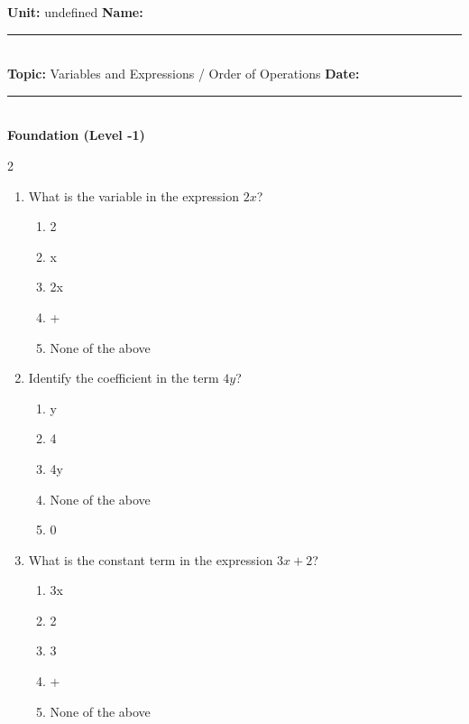 \documentclass[10pt]{article}
\begin{document}
\enlargethispage{2.5cm}

\begin{tcolorbox}[colback=mainblue!5, colframe=mainblue, sharp corners, boxrule=0.5pt]
    \small \textbf{Unit:} undefined \hfill \textbf{Name:} \rule{3cm}{0.4pt} \\
    \small \textbf{Topic:} Variables and Expressions / Order of Operations \hfill \textbf{Date:} \rule{2cm}{0.4pt} \\
    \centering \textbf{\large Foundation (Level -1)}
\end{tcolorbox}

\vspace{0.2cm}

\begin{multicols}{2}
\begin{enumerate}[label=\textbf{Q\arabic*.}, leftmargin=*, itemsep=6pt, parsep=0pt]

  \item \small What is the variable in the expression $2x$?
  \begin{enumerate}[label=(\Alph*), leftmargin=0.6cm, nosep, itemsep=2pt]
    \item 2
    \item x
    \item 2x
    \item +
    \item None of the above
  \end{enumerate}

  \item \small Identify the coefficient in the term $4y$?
  \begin{enumerate}[label=(\Alph*), leftmargin=0.6cm, nosep, itemsep=2pt]
    \item y
    \item 4
    \item 4y
    \item None of the above
    \item 0
  \end{enumerate}

  \item \small What is the constant term in the expression $3x + 2$?
  \begin{enumerate}[label=(\Alph*), leftmargin=0.6cm, nosep, itemsep=2pt]
    \item 3x
    \item 2
    \item 3
    \item +
    \item None of the above
  \end{enumerate}


\end{enumerate}
\end{multicols}
\end{document}
